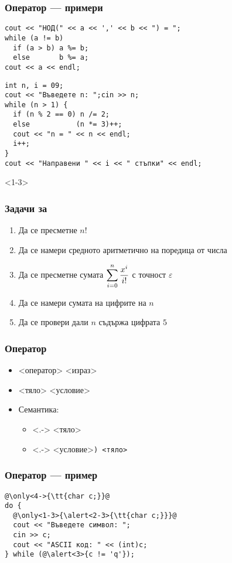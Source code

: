 \documentclass[alsotrans]{beamerswitch}
\newcommand{\expsum}{\displaystyle \sum_{i=0}^n \limits \frac{x^i}{i!}}
\begin{document}
\begin{frame}[fragile]
  \frametitle{Оператор  --- примери}

\begin{lstlisting}
cout << "НОД(" << a << ',' << b << ") = ";
while (a != b)
  if (a > b) a %= b;
  else       b %= a;
cout << a << endl;
\end{lstlisting}
\pause
\begin{lstlisting}
int n, i = 09;
cout << "Въведете n: ";cin >> n;
while (n > 1) {
  if (n % 2 == 0) n /= 2;
  else           (n *= 3)++;
  cout << "n = " << n << endl;
  i++;
}
cout << "Направени " << i << " стъпки" << endl;
\end{lstlisting}
\end{frame}

\begin{frame}<1-3>
  \frametitle{Задачи за }

  \begin{enumerate}[<+->]
  \item Да се пресметне $n!$
  \item Да се намери средното аритметично на поредица от числа
  \item Да се пресметне сумата $\expsum$ с точност $\varepsilon$
  \item Да се намери сумата на цифрите на $n$
  \item Да се провери дали $n$ съдържа цифрата $5$
  \end{enumerate}
\end{frame}

\begin{frame}
  \frametitle{Оператор }

  \begin{itemize}[<+->]
  \item {} <оператор> <израз>\tta{);}
  \item {} <тяло> <условие>\tta{);}
  \item Семантика:
    \begin{itemize}
    \item<.-> <тяло>
    \item<.-> <условие>\tt) <тяло>
    \end{itemize}
  \end{itemize}
\end{frame}

\begin{frame}
  \frametitle{Оператор  --- пример}

\begin{lstlisting}
@\only<4->{\tt{char c;}}@
do {
  @\only<1-3>{\alert<2-3>{\tt{char c;}}}@
  cout << "Въведете символ: ";
  cin >> c;
  cout << "ASCII код: " << (int)c;
} while (@\alert<3>{c != 'q'});
\end{lstlisting}
\end{frame}
\end{document}
